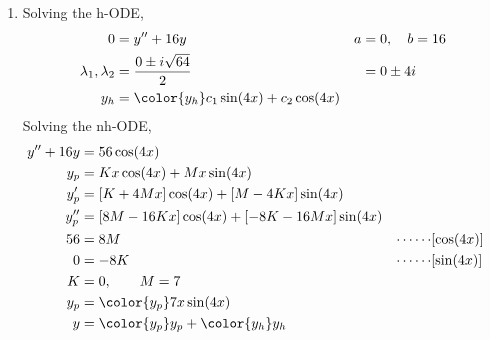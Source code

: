 \begin{enumerate}
    \item Solving the h-ODE,
          \begin{align}
              0                        & = y'' + 16y                                 & a & = 0, \quad b = 16 \\
              \lambda_{1}, \lambda_{2} & = \frac{0 \pm i\sqrt{64}}{2}                &   & = 0 \pm 4i        \\
              y_{h}                    & = \color{y_h} c_{1}\sin(4x) + c_{2}\cos(4x)
          \end{align}
          Solving the nh-ODE,
          \begin{align}
              y'' + 16y & = 56\cos(4x)                                                               \\
              y_{p}     & = Kx \cos(4x) + Mx \sin(4x)                                                \\
              y_{p}'    & = [K + 4Mx] \cos(4x) + [M - 4Kx] \sin(4x)                                  \\
              y_{p}''   & = [8M - 16Kx] \cos(4x) + [-8K - 16Mx] \sin(4x)                             \\
              56        & = 8M                                           & \cdots\cdots & [\cos(4x)] \\
              0         & = -8K                                          & \cdots\cdots & [\sin(4x)] \\
              K         & = 0, \qquad M = 7                                                          \\
              y_{p}     & = \color{y_p} 7x \sin(4x)                                                  \\
              y         & = {\color{y_p} y_{p}} + {\color{y_h} y_{h}}
          \end{align}


\end{enumerate}

